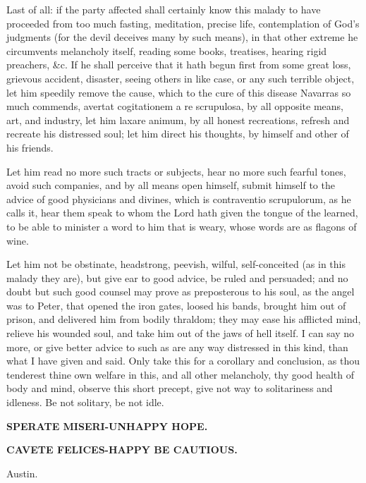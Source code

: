 {Last of all: if the party affected shall certainly know this malady to
have proceeded from too much fasting, meditation, precise life,
contemplation of God's judgments (for the devil deceives many by such
means), in that other extreme he circumvents melancholy itself, reading
some books, treatises, hearing rigid preachers, \&c. If he shall
perceive that it hath begun first from some great loss, grievous
accident, disaster, seeing others in like case, or any such terrible
object, let him speedily remove the cause, which to the cure of this
disease Navarras so much commends, avertat cogitationem a re
scrupulosa, by all opposite means, art, and industry, let him laxare
animum, by all honest recreations, refresh and recreate his distressed
soul; let him direct his thoughts, by himself and other of his friends.

Let him read no more such tracts or subjects, hear no more such fearful
tones, avoid such companies, and by all means open himself, submit
himself to the advice of good physicians and divines, which is
contraventio scrupulorum, as he calls it, hear them speak to whom
the Lord hath given the tongue of the learned, to be able to minister a
word to him that is weary, whose words are as flagons of wine.

Let him not be obstinate, headstrong, peevish, wilful, self-conceited
(as in this malady they are), but give ear to good advice, be ruled and
persuaded; and no doubt but such good counsel may prove as preposterous
to his soul, as the angel was to Peter, that opened the iron gates,
loosed his bands, brought him out of prison, and delivered him from
bodily thraldom; they may ease his afflicted mind, relieve his wounded
soul, and take him out of the jaws of hell itself. I can say no more,
or give better advice to such as are any way distressed in this kind,
than what I have given and said. Only take this for a corollary and
conclusion, as thou tenderest thine own welfare in this, and all other
melancholy, thy good health of body and mind, observe this short
precept, give not way to solitariness and idleness. Be not solitary, be
not idle.

\textbf{\textlatin{SPERATE MISERI}-UNHAPPY HOPE.}

\textbf{\textlatin{CAVETE FELICES}-HAPPY BE CAUTIOUS.}

 Austin.
}
